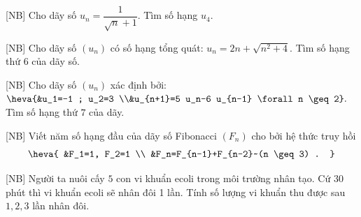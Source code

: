 \begin{bt}%
[NB]
	Cho dãy số $u_n=\dfrac{1}{\sqrt{n}+1}$. Tìm số hạng $u_4$.	
\end{bt}

\begin{bt}%
[NB]
	Cho dãy số $(u_n)$ có số hạng tổng quát: $u_n=2 n+\sqrt{n^2+4}$. Tìm số hạng thứ $6$ của dãy số.
\end{bt}

\begin{bt}%
[NB]
	Cho dãy số $(u_n)$ xác định bởi: $\heva{&u_1=-1 ; u_2=3 \\&u_{n+1}=5 u_n-6 u_{n-1} \forall n \geq 2}.$ Tìm số hạng thứ $7$ của dãy.
\end{bt}

\begin{bt}%
[NB]
	Viết năm số hạng đầu của dãy số Fibonacci $\left(F_n\right)$ cho bởi hệ thức truy hồi
	$$
	\heva{
		&F_1=1, F_2=1 \\
		&F_n=F_{n-1}+F_{n-2}~(n \geq 3) .
	}
	$$
\end{bt}

\begin{bt}%
[NB]
	Người ta nuôi cấy $5$ con vi khuẩn ecoli trong môi trường nhân tạo. Cứ $30$ phút thì vi khuẩn ecoli sẽ nhân đôi 1 lần. Tính số lượng vi khuẩn thu được sau $1,2,3$ lần nhân đôi.
\end{bt}

